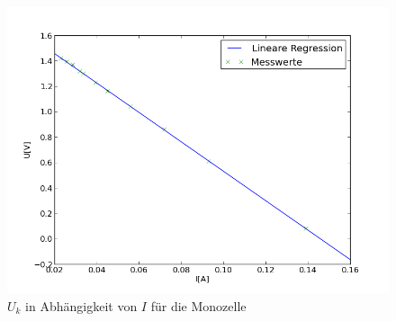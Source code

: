 \documentclass[11pt]{article}
\begin{document}
\begin{figure}
\centering
\includegraphics[scale=1.00]{Plot1.png}
\caption{$U_k$ in Abh\"angigkeit von $I$ f\"ur die Monozelle}
\label{Plot1}
\end{figure}
\end{document}
